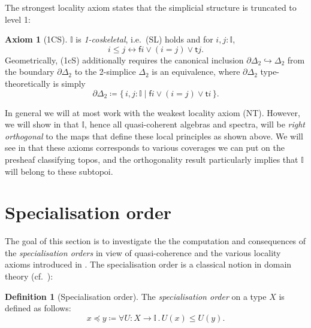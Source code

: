 \documentclass[a4paper,12pt]{amsart}
\theoremstyle{definition}
\newtheorem{definition}[theorem]{Definition}
\newtheorem*{axiom}{Axiom}
\newcommand{\mbb}[1]{\mathbb{#1}}
\newcommand{\I}{\mbb I}
\newcommand{\ms}[1]{\mathsf{#1}}
\newcommand{\scomp}[2]{\{\,#1\mid#2\,\}}
\newcommand{\hook}{\hookrightarrow}
\newcommand{\fa}[2]{\forall #1\!\colon\!\!#2\mathpunct{.}}
\newcommand{\eq}{\leftrightarrow}
\begin{document}
The strongest locality axiom states that the simplicial structure is truncated to level 1:

\begin{axiom}[1CS]\label{ax:1cS}
  $\I$ is \emph{1-coskeletal}, i.e.\ (SL) holds and for $i,j : \I$, 
  \[ i \le j \eq \ms fi \vee (i = j)\vee \ms tj. \]
  Geometrically, (1cS) additionally requires the canonical inclusion $\partial\Delta_2 \hook \Delta_2$ from the boundary $\partial\Delta_2$ to the 2-simplice $\Delta_2$ is an equivalence, where $\partial\Delta_2$ type-theoretically is simply
  \[ \partial\Delta_2 \coloneq \scomp{i,j : \I}{\ms fi \vee (i = j) \vee \ms ti}. \]
\end{axiom}

In general we will at most work with the weakest locality axiom (NT). However, we will show in  that $\I$, hence all quasi-coherent algebras and spectra, will be \emph{right orthogonal} to the maps that define these local principles as shown above. We will see in  that these axioms corresponds to various coverages we can put on the presheaf classifying topos, and the orthogonality result particularly implies that $\I$ will belong to these subtopoi.



\section{Specialisation order}\label{sec:intposet}

The goal of this section is to investigate the the computation and consequences of the \emph{specialisation orders} in view of quasi-coherence and the various locality axioms introduced in . The specialisation order is a classical notion in domain theory (cf.~\cite{PhoaWesleyKym-Son1991DtiR,hyland1990first}):

\begin{definition}[Specialisation order]\label{defn:specialisation}
  The \emph{specialisation order} on a type $X$ is defined as follows:
  \[ x \preceq y \coloneq \fa{U}{X\to\I} U(x) \le U(y). \]
\end{definition}
\end{document}
